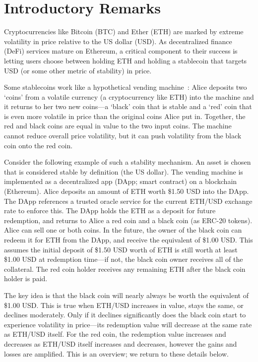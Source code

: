 

\section{Introductory Remarks}

Cryptocurrencies like Bitcoin (BTC) and Ether (ETH) are marked by extreme volatility in price relative to the US dollar (USD). As decentralized finance (DeFi) services mature on Ethereum, a critical component to their success is letting users choose between holding ETH and holding a stablecoin that targets USD (or some other metric of stability) in price.

Some stablecoins work like a hypothetical vending machine~\cite{CDM20}: Alice deposits two `coins' from a volatile currency (\eg a cryptocurrency like ETH) into the machine and it returns to her two new coins---a `black' coin that is stable and a `red' coin that is even more volatile in price than the original coins Alice put in. Together, the red and black coins are equal in value to the two input coins. The machine cannot reduce overall price volatility, but it can push volatility from the black coin onto the red coin. 

Consider the following example of such a stability mechanism. An asset is chosen that is considered stable by definition (\eg the US dollar). The vending machine is implemented as a decentralized app (DApp; \aka smart contract) on a blockchain (\eg Ethereum). Alice deposits an amount of ETH worth \$1.50 USD into the DApp. The DApp references a trusted oracle service for the current ETH/USD exchange rate to enforce this. The DApp holds the ETH as a deposit for future redemption, and returns to Alice a red coin and a black coin (\eg as ERC-20 tokens). Alice can sell one or both coins. In the future, the owner of the black coin can redeem it for ETH from the DApp, and receive the equivalent of \$1.00 USD. This assumes the initial deposit of \$1.50 USD worth of ETH is still worth at least \$1.00 USD at redemption time---if not, the black coin owner receives all of the collateral. The red coin holder receives any remaining ETH after the black coin holder is paid.

The key idea is that the black coin will nearly always be worth the equivalent of \$1.00 USD. This is true when ETH/USD increases in value, stays the same, or declines moderately. Only if it declines significantly does the black coin start to experience volatility in price---its redemption value will decrease at the same rate as ETH/USD itself. For the red coin, the redemption value increases and decreases as ETH/USD itself increases and decreases, however the gains and losses are amplified. This is an overview; we return to these details below.

